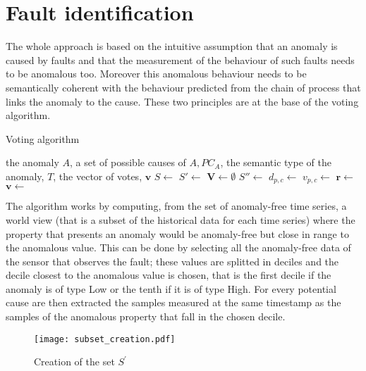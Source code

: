\section{Fault identification}
The whole approach is based on the intuitive assumption that an anomaly is caused by faults and that the measurement of the behaviour of such faults needs to be anomalous too. Moreover this anomalous behaviour needs to be semantically coherent with the behaviour predicted from the chain of process that links the anomaly to the cause. These two principles are at the base of the voting algorithm.
\begin{algorithm}
  \caption{Voting algorithm}\label{diagnosis}
  \begin{algorithmic}[1]
    \Require
      \Statex the anomaly $A$,
      \Statex a set of possible causes of $ A, PC_A$,
      \Statex the semantic type of the anomaly, $T$,
    \Ensure the vector of votes, $\bm v$
    \State $S\leftarrow$ 
    \State $S'\leftarrow$ 
    \State $\bm V\leftarrow\emptyset$
    \State $S''\leftarrow$ 
    \State $d_{p,c}\leftarrow$ 
    \State $v_{p,c}\leftarrow$ 
    \EndFor
    \State $\bm r\leftarrow$ 
    \State $\bm v\leftarrow$ 
    \EndFor
    \EndProcedure
  \end{algorithmic}
\end{algorithm}
The algorithm works by computing, from the set of anomaly-free time series, a world view (that is a subset of the historical data for each time series) where the property that presents an anomaly would be anomaly-free but close in range to the anomalous value. This can be done by selecting all the anomaly-free data of the sensor that observes the fault; these values are splitted in deciles and the decile closest to the anomalous value is chosen, that is the first decile if the anomaly is of type Low or the tenth if it is of type High. For every potential cause are then extracted the samples measured at the same timestamp as the samples of the anomalous property that fall in the chosen decile.
\begin{figure}
  \centering
  \texttt{[image: subset\_creation.pdf]}
  \caption{Creation of the set $S^{'}$}
  \label{fig:subsets}
\end{figure}
